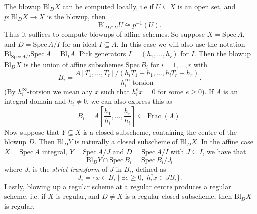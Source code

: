 \documentclass{article}
\theoremstyle{definition}
\theoremstyle{plain}
\theoremstyle{remark}
\newcommand{\spec}{\mathrm{Spec}\,}
\newcommand{\bl}{\mathrm{Bl}}
\DeclareMathOperator{\Frac}{\mathrm{Frac}}
\begin{document}
	The blowup $\bl_DX$ can be computed locally, i.e if $U\subseteq X$ is an open set, and $p: \bl_D X\to X$ is the blowup, then 
	\[\bl_{D\cap U} U \cong p^{-1}(U).\]
	Thus it suffices to compute blowups of affine schemes. So suppose $X = \spec A$, and $D = \spec A/I$ for an ideal $I\subseteq A$. In this case we will also use the notation $\bl_{\spec A/I}\spec A = \bl_I A$. Pick generators $I = (h_1, \ldots, h_r)$ for $I$. Then the blowup $\bl_DX$ is the union of affine subschemes $\spec B_i$ for $i= 1, \ldots, r$ with 
	\[B_i = \frac{A[T_1, \ldots, T_r]/(h_iT_1-h_1, \ldots, h_iT_r-h_r)}{\text{$h_i^\infty$-torsion}}.\]
	(By $h_i^\infty$-torsion we mean any $x$ such that $h_i^ex=0$ for some $e\ge 0$). If $A$ is an integral domain and $h_i\not=0$, we can also express this as
	\[B_i = A\left[\frac{h_1}{h_i},\ldots, \frac{h_r}{h_i}\right]\subseteq \Frac(A).\]
	Now suppose that $Y\subseteq X$ is a closed subscheme, containing the centre of the blowup $D$. Then $\bl_D Y$ is naturally a closed subscheme of $\bl_D X$. In the affine case $X = \spec A$ integral, $Y = \spec A/J$ and $D =\spec A/I$ with $J\subseteq I$, we have that 
	\[\bl_D Y \cap \spec B_i = \spec B_i/J_i\]
	where $J_i$ is the \emph{strict transform} of $J$ in $B_i$, defined as
	\[J_i = \{x\in B_i\mid \exists e\ge 0,\; h_i^e x\in JB_i\}.\]
	Lastly, blowing up a regular scheme at a regular centre produces a regular scheme, i.e. if $X$ is regular, and $D\not=X$ is a regular closed subscheme, then $\bl_D X$ is regular.
\end{document}
